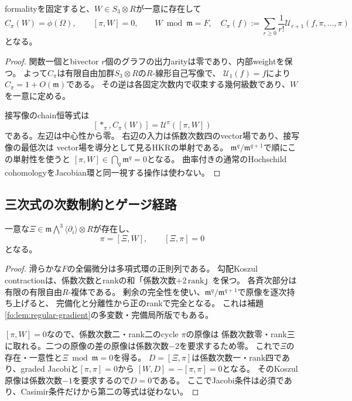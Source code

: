\begin{lemma}[中心逆像を有限行列で取り出す]\label{cft:lem:center}
formalityを固定すると、$W\in S_3\otimes R$が一意に存在して
\begin{equation}\label{cft:eq:center}
 C_\pi(W)=\phi(\Omega),\qquad [\pi,W]=0,\qquad W\bmod\mathfrak m=F,
 \quad
 C_\pi(f):=\sum_{r\ge0}\frac1{r!}\mathcal U_{r+1}(f,\pi,\ldots,\pi)
\end{equation}
となる。
\end{lemma}
\begin{proof}
関数一個とbivector $r$個のグラフの出力arityは零であり、内部weightを保つ。
よって$C_\pi$は有限自由加群$S_3\otimes R$の$R$-線形自己写像で、
$\mathcal U_1(f)=f$により$C_\pi=1+O(\mathfrak m)$である。
その逆は各固定次数内で収束する幾何級数であり、$W$を一意に定める。

接写像のchain恒等式は
\begin{equation}\label{cft:eq:chain-center}
 [*_\pi,C_\pi(W)]=\mathcal U^\pi([\pi,W])
\end{equation}
である。左辺は中心性から零。
右辺の入力は係数次数四のvector場であり、接写像の最低次は
vector場を導分として見るHKRの単射である。
$\mathfrak m^q/\mathfrak m^{q+1}$で順にこの単射性を使うと
$[\pi,W]\in\bigcap_q\mathfrak m^q=0$となる。
曲率付きの通常のHochschild cohomologyをJacobian環と同一視する操作は使わない。
\end{proof}

\subsection{三次式の次数制約とゲージ経路}
\begin{lemma}[唯一の定数三重vectorと二回目の作用]\label{cft:lem:primitive}
一意な$\Xi\in\mathfrak m\bigwedge^3\langle\partial_i\rangle\otimes R$が存在し、
\begin{equation}\label{cft:eq:primitive}
 \pi=[\Xi,W],\qquad [\Xi,\pi]=0
\end{equation}
となる。
\end{lemma}
\begin{proof}
滑らかな$F$の全偏微分は多項式環の正則列である。
勾配Koszul contractionは、係数次数とrankの和「係数次数$+2\,\mathrm{rank}$」を保つ。
各斉次部分は有限の有限自由$R$-複体である。
剰余の完全性を使い、$\mathfrak m^q/\mathfrak m^{q+1}$で原像を逐次持ち上げると、
完備化と分離性から正のrankで完全となる。
これは補題\ref{fo:lem:regular-gradient}の多変数・完備局所版でもある。

$[\pi,W]=0$なので、係数次数二・rank二のcycle $\pi$の原像は
係数次数零・rank三に取れる。二つの原像の差の原像は係数次数$-2$を要求するため零。
これで$\Xi$の存在・一意性と$\Xi\bmod\mathfrak m=0$を得る。
$D=[\Xi,\pi]$は係数次数一・rank四であり、graded Jacobiと$[\pi,\pi]=0$から
$[W,D]=-[\pi,\pi]=0$となる。
そのKoszul原像は係数次数$-1$を要求するので$D=0$である。
ここでJacobi条件は必須であり、Casimir条件だけから第二の等式は従わない。
\end{proof}

